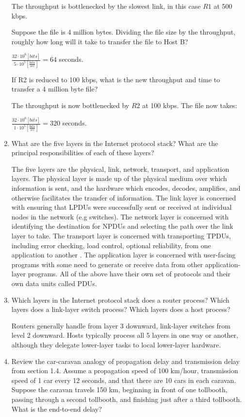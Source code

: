 \documentclass[10pt]{article}
\begin{document}
\begin{enumerate}
    The throughput is bottlenecked by the slowest link, in this case $R1$ at 500 kbps.
    
    Suppose the file is 4 million bytes. Dividing the file size by the throughput, roughly how long will it take to transfer the file to Host B?
    
    $\frac{32\cdot 10^6[bits]}{5\cdot 10^5 [\frac{bits}{sec}]} = 64$ seconds.
    
    If R2 is reduced to 100 kbps, what is the new throughput and time to transfer a 4 million byte file?
    
    The throughput is now bottlenecked by $R2$ at 100 kbps.  The file now takes:
    
    $\frac{32\cdot 10^6[bits]}{1\cdot 10^5 [\frac{bits}{sec}]} = 320$ seconds.

    \item What are the five layers in the Internet protocol stack? What are the principal responsibilities of each of these layers?

    The five layers are the physical, link, network, transport, and application layers.  The physical layer is made up of the physical medium over which information is sent, and the hardware which encodes, decodes, amplifies, and otherwise facilitates the transfer of information.  The link layer is concerned with ensuring that LPDUs were successfully sent or received at individual nodes in the network (e.g switches).  The network layer is concerned with identifying the destination for NPDUs and selecting the path over the link layer to take.  The transport layer is concerned with transporting TPDUs, including error checking, load control, optional reliability, from one application to another .  The application layer is concerned with user-facing programs with some need to generate or receive data from other application-layer programs.  All of the above have their own set of protocols and their own data units called PDUs.
    
    \item Which layers in the Internet protocol stack does a router process? Which layers does a link-layer switch process? Which layers does a host process?
    
    Routers generally handle from layer 3 downward, link-layer switches from level 2 downward.  Hosts typically process all 5 layers in one way or another, although they delegate lower-layer tasks to local lower-layer hardware.

    \item Review the car-caravan analogy of propagation delay and transmission delay from section 1.4.  Assume a propagation speed of 100 km/hour, transmission speed of 1 car every 12 seconds, and that there are 10 cars in each caravan.  Suppose the caravan travels 150 km, beginning in front of one tollbooth, passing through a second tollbooth, and finishing just after a third tollbooth. What is the end-to-end delay?
    

\end{enumerate}
\end{document}
